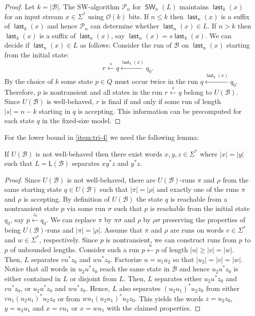 \documentclass{theoretics}
\newcommand{\B}{\mathcal{B}}
\renewcommand{\O}{\mathcal{O}}
\renewcommand{\P}{\mathcal{P}}
\renewcommand{\L}{\mathsf{L}}
\DeclareMathOperator{\last}{\mathsf{last}}
\DeclareMathOperator{\SW}{\mathsf{SW}}
\renewcommand{\geq}{\geqslant}
\renewcommand{\leq}{\leqslant}
\renewcommand{\ge}{\geq}
\begin{document}
\begin{proof}
	Let $k = |\B|$.
	The SW-algorithm $\P_n$ for $\SW_n(L)$ maintains $\last_{k}(x)$ for an input stream $x \in \Sigma^*$
	using $\O(k)$ bits.
	If $n \leq k$ then $\last_n(x)$ is a suffix of $\last_{k}(x)$ and hence $\P_n$ can determine
	whether $\last_n(x) \in L$.
	If $n > k$ then $\last_{k}(x)$ is a suffix of $\last_n(x)$,
	say $\last_n(x) = s  \last_{k}(x)$.
	We can decide if $\last_n(x) \in L$ as follows:
	Consider the run of $\B$ on $\last_n(x)$ starting from the initial state:
	\[ r \xleftarrow{s} q \xleftarrow{\last_{k}(x)} q_0 . \]
	By the choice of $k$ some state $p \in Q$ must occur twice in the run $q \xleftarrow{\last_{k}(x)} q_0$.
	Therefore, $p$ is nontransient and all states in the run $r \xleftarrow{s} q$ belong to $U(\B)$.
	Since $U(\B)$ is well-behaved, $r$ is final
	if and only if some run of length $|s| = n - k$ starting in $q$ is accepting.
	This information can be precomputed for each state $q$ in the fixed-size model.
\end{proof}
For the lower bound in \ref{item:tri-4} we need the following lemma:
\begin{lemma}
	\label{lem:nonwb-loop}
	If $U(\B)$ is not well-behaved
	then there exist words $x, y, z \in \Sigma^*$
	where $|x| = |y|$ such that
	$L = \L(\B)$ separates $xy^*z$ and $y^*z$.
\end{lemma}

\begin{proof}
	Since $U(\B)$ is not well-behaved, there are $U(\B)$-runs $\pi$ and $\rho$
	from the same starting state $q \in U(\B)$ such that $|\pi| = |\rho|$
	and exactly one of the runs $\pi$ and $\rho$ is accepting.
	By definition of $U(\B)$ the state $q$ is reachable from a nontransient state $p$ via some run $\sigma$
	such that $p$ is reachable from the initial state $q_0$, say $p \xleftarrow{z_0} q_0$.
	We can replace $\pi$ by $\pi \sigma$ and $\rho$ by $\rho \sigma$
	preserving the properties of being $U(\B)$-runs and $|\pi| = |\rho|$.
	Assume that $\pi$ and $\rho$ are runs on words $v \in \Sigma^*$ and $w \in \Sigma^*$, respectively.
	Since $p$ is nontransient,
	we can construct runs from $p$ to $p$ of unbounded lengths.
	Consider such a run $p \xleftarrow{u} p$ of length $|u| \ge |v| = |w|$.
	Then, $L$ separates $v u^* z_0$ and $w u^* z_0$.
	Factorize $u = u_1 u_2$ so that $|u_2| = |v| = |w|$.
	Notice that all words in $u_2 u^*z_0$ reach the same state in $\B$
	and hence $u_2 u^*z_0$ is either contained in $L$ or disjoint from $L$.
	Then, $L$ separates either $u_2 u^* z_0$ and $v u^* z_0$,
	or $u_2 u^* z_0$ and $w u^* z_0$.
	Hence, $L$ also separates $(u_2 u_1)^*  u_2 z_0$ from either $v u_1 (u_2 u_1)^*  u_2 z_0$ or from $w u_1 (u_2 u_1)^*  u_2 z_0$.
	This yields the words $z= u_2 z_0$, $y=u_2 u_1$ and $x=v u_1$ or $x=w u_1$ with the claimed properties.
\end{proof}
\end{document}
